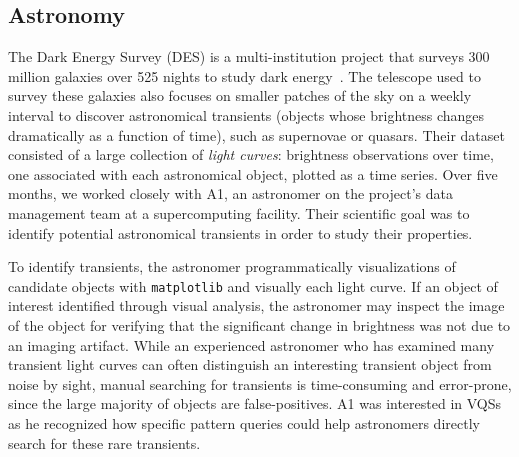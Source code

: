  \subsection{Astronomy}
 \par\noindent{} 
 \npar The Dark Energy Survey (DES) is a multi-institution project that surveys 300 million galaxies over 525 nights to study dark energy~\cite{DrlicaWagner2018}. The telescope used to survey these galaxies also focuses on smaller patches of the sky on a weekly interval to discover astronomical transients (objects whose brightness changes dramatically as a function of time), such as supernovae or quasars. Their dataset consisted of a large collection of \emph{light curves}: brightness observations over time, one associated with each astronomical object, plotted as a time series. Over five months, we worked closely with A1, an astronomer on the project's data management team at a supercomputing facility. Their scientific goal was to identify potential astronomical transients in order to study their properties. 
 \par\noindent{} 
 \npar {} To identify transients, the astronomer programmatically  visualizations of candidate objects with \texttt{matplotlib} and visually  each light curve.  If an object of interest  identified through visual analysis, the astronomer may inspect the image of the object for verifying that the significant change in brightness was not due to an imaging artifact. While an experienced astronomer who has examined many transient light curves can often distinguish an interesting transient object from noise by sight, manual searching for transients is time-consuming and error-prone, since the large majority of objects are false-positives. A1 was interested in VQSs as he recognized how specific pattern queries could help astronomers directly search for these rare transients.
